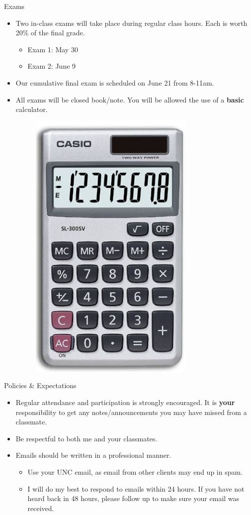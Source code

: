 \documentclass[xcolor={dvipsnames},pdf, hyperref={colorlinks=true, citecolor=ForestGreen, linkcolor=BlueViolet, urlcolor=Magenta}]{beamer}
\begin{document}
	
		\begin{frame}{Exams}
			
			\begin{itemize}
				\item Two in-class exams will take place during regular class hours. Each is worth 20\% of the final grade.
				\begin{itemize}
					\item Exam 1: May 30
					\item Exam 2: June 9
				\end{itemize}
				\item Our cumulative final exam is scheduled on June 21 from 8-11am.
				\item All exams will be closed book/note. You will be allowed the use of a \textbf{basic} calculator.
					 \begin{figure}
					 	\centering
					 	\includegraphics[width=.2\linewidth]{basic.jpg}
					 \end{figure}
			\end{itemize}
			
		\end{frame}
	
\begin{frame}{Policies \& Expectations}
	
		\begin{itemize}
			
			\item Regular attendance and participation is strongly encouraged. It is \textbf{your} responsibility to get any notes/announcements you may have missed from a classmate.
			\item Be respectful to both me and your classmates.
			\item Emails should be written in a professional manner.
				\begin{itemize}
					\item Use your UNC email, as email from other clients may end up in spam.
					\item I will do my best to respond to emails within 24 hours. If you have not heard back in 48 hours, please follow up to make sure your email was received.
				\end{itemize}  
		\end{itemize}

	
\end{frame}
\end{document}
